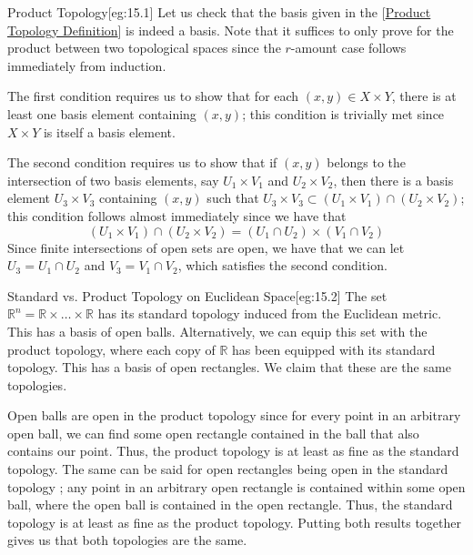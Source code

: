 \begin{egBox}{Product Topology}[eg:15.1]
    Let us check that the basis given in the [\hyperlink{def:15_product_top}
    {Product Topology Definition}] is indeed a basis. 
    Note that it suffices to only prove for the product between two topological
    spaces since the \( r \)-amount case follows immediately from induction.

    \baseSkip 

    The first condition requires us to show that for each 
    \( ( x, y ) \in X \times Y \), there is at least one basis element 
    containing \( ( x, y ) \);
    this condition is trivially met since \( X \times Y \) is itself a 
    basis element.

    \baseSkip

    The second condition requires us to show that if \( ( x, y ) \) belongs to
    the intersection of two basis elements, say \( U_{ 1 } \times V_{ 1 } \) 
    and \( U_{ 2 } \times V_{ 2 } \), then there is a basis element
    \( U_{ 3 } \times V_{ 3 } \) containing \( ( x, y ) \) such that 
    \( U_{ 3 } \times V_{ 3 } \subset ( U_{ 1 } \times V_{ 1 } )
    \cap ( U_{ 2 } \times V_{ 2 } ) \);
    this condition follows almost immediately since we have that 
    \begin{equation*}
        ( U_{ 1 } \times V_{ 1 } ) \cap ( U_{ 2 } \times V_{ 2 } )
        =
        ( U_{ 1 } \cap U_{ 2 } ) \times ( V_{ 1 } \cap V_{ 2 } )
    \end{equation*}
    Since finite intersections of open sets are open, we have that we can let 
    \( U_{ 3 } = U_{ 1 } \cap U_{ 2 } \) and 
    \( V_{ 3 } = V_{ 1 } \cap V_{ 2 } \), which satisfies the second condition.
\end{egBox}

\begin{egBox}{Standard vs. Product Topology on Euclidean Space}[eg:15.2]
    The set \( \mathbb{R}^{ n } = \mathbb{R} \times \ldots \times \mathbb{R} \)
    has its standard topology induced from the Euclidean metric. 
    This has a basis of open balls.
    Alternatively, we can equip this set with the product topology, where each 
    copy of \( \mathbb{R} \) has been equipped with its standard topology.
    This has a basis of open rectangles.
    We claim that these are the same topologies.

    \baseSkip

    Open balls are open in the product topology since for every point in an arbitrary open ball, we can find some open rectangle contained in the ball that also contains our point.
    Thus, the product topology is at least as fine as the standard topology.
    The same can be said for open rectangles being open in the standard topology
    ; any point in an arbitrary open rectangle is contained within some open
    ball, where the open ball is contained in the open rectangle.
    Thus, the standard topology is at least as fine as the product topology.
    Putting both results together gives us that both topologies are the 
    same.
\end{egBox}

